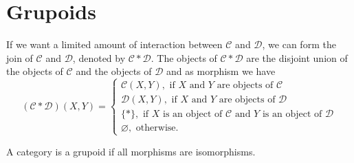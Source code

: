 \section{Grupoids}

If we want a limited amount of interaction between $\mathcal{C}$ and $\mathcal{D}$, we can form the join of $\mathcal{C}$ and $\mathcal{D}$, denoted by $\mathcal{C} * \mathcal{D}$. The objects of $\mathcal{C} * \mathcal{D}$ are the disjoint union of the objects of $\mathcal{C}$ and the objects of $\mathcal{D}$ and as morphism we have
$$
(\mathcal{C} * \mathcal{D})(X, Y)=\left\{\begin{array}{l}
\mathcal{C}(X, Y), \text { if } X \text { and } Y \text { are objects of } \mathcal{C} \\
\mathcal{D}(X, Y), \text { if } X \text { and } Y \text { are objects of } \mathcal{D} \\
\{*\}, \text { if } X \text { is an object of } \mathcal{C} \text { and } Y \text { is an object of } \mathcal{D} \\
\varnothing, \text { otherwise. }
\end{array}\right.
$$

A category is a grupoid if all morphisms are isomorphisms.

